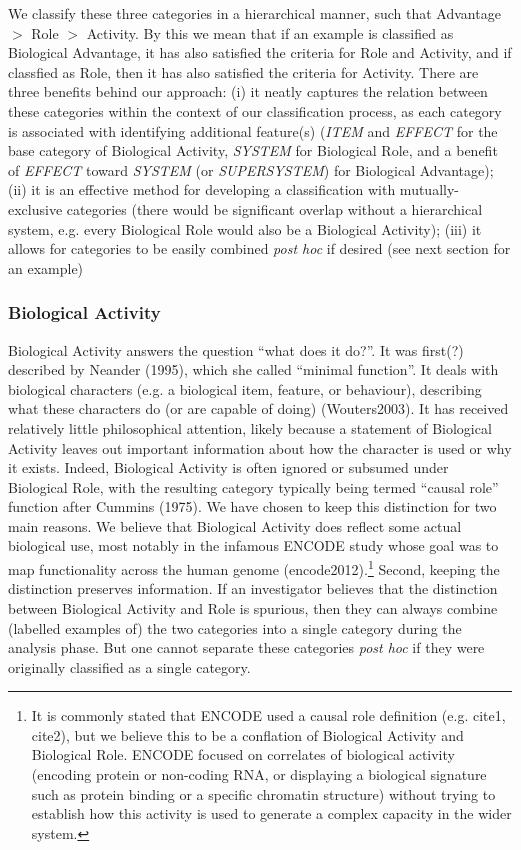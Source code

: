 \documentclass{article}
\begin{document}
We classify these three categories in a hierarchical manner, such that Advantage $>$ Role $>$ Activity.
By this we mean that if an example is classified as Biological Advantage, it has also satisfied the criteria for Role and Activity, and if classfied as Role, then it has also satisfied the criteria for Activity.
There are three benefits behind our approach: (i) it neatly captures the relation between these categories within the context of our classification process, as each category is associated with identifying additional feature(s) (\emph{ITEM} and \emph{EFFECT} for the base category of Biological Activity, \emph{SYSTEM} for Biological Role, and a benefit of \emph{EFFECT} toward \emph{SYSTEM} (or \emph{SUPERSYSTEM}) for Biological Advantage); (ii) it is an effective method for developing a classification with mutually-exclusive categories (there would be significant overlap without a hierarchical system, e.g. every Biological Role would also be a Biological Activity); (iii) it allows for categories to be easily combined \emph{post hoc} if desired (see next section for an example)

\subsubsection{Biological Activity}
\label{sec:biological-activity-1}

Biological Activity answers the question ``what does it do?''.
It was first(?) described by Neander (1995), which she called ``minimal function''.
It deals with biological characters (e.g. a biological item, feature, or behaviour), describing what these characters do (or are capable of doing) (Wouters2003).
It has received relatively little philosophical attention, likely because a statement of Biological Activity leaves out important information about how the character is used or why it exists.
Indeed, Biological Activity is often ignored or subsumed under Biological Role, with the resulting category typically being termed ``causal role'' function after Cummins (1975).
We have chosen to keep this distinction for two main reasons.
We believe that Biological Activity does reflect some actual biological use, most notably in the infamous ENCODE study whose goal was to map functionality across the human genome (encode2012).\footnote{It is commonly stated that ENCODE used a causal role definition (e.g. cite1, cite2), but we believe this to be a conflation of Biological Activity and Biological Role. ENCODE focused on correlates of biological activity (encoding protein or non-coding RNA, or displaying a biological signature such as protein binding or a specific chromatin structure) without trying to establish how this activity is used to generate a complex capacity in the wider system.}
Second, keeping the distinction preserves information.
If an investigator believes that the distinction between Biological Activity and Role is spurious, then they can always combine (labelled examples of) the two categories into a single category during the analysis phase.
But one cannot separate these categories \emph{post hoc} if they were originally classified as a single category.
\end{document}
